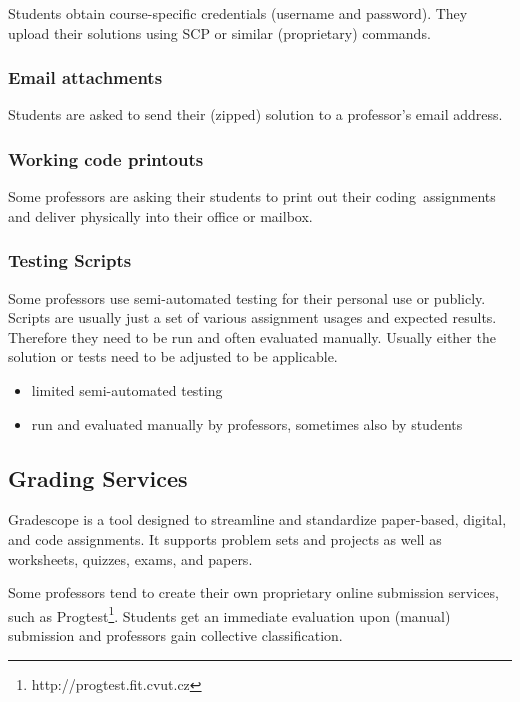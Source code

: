 {Students obtain course-specific credentials (username and password). They upload their solutions using SCP or similar (proprietary) commands.}

\subsubsection{Email attachments}

{Students are asked to send their (zipped) solution to a professor's email address.}

\subsubsection{Working code printouts}

{Some professors are asking their students to print out their }{coding}{~assignments and deliver physically into their office or mailbox.}

\subsubsection{Testing Scripts}

{Some professors use semi-automated testing for their personal use or publicly. Scripts are usually just a set of various assignment usages and expected results. Therefore they need to be run and often evaluated manually. Usually either the solution or tests need to be adjusted to be applicable.}

\begin{itemize}
\item
  {limited semi-automated testing}
\item
  {run and evaluated manually by professors, sometimes also by students}
\end{itemize}

\subsection{Grading Services}

{Gradescope is a tool designed to streamline and standardize paper-based, digital, and code assignments. It supports problem sets and projects as well as worksheets, quizzes, exams, and papers.}

{Some professors tend to create their own proprietary online submission services, such as }{Progtest\footnote{http://progtest.fit.cvut.cz}}{. Students get an immediate evaluation upon (manual) submission and professors gain collective classification.}


